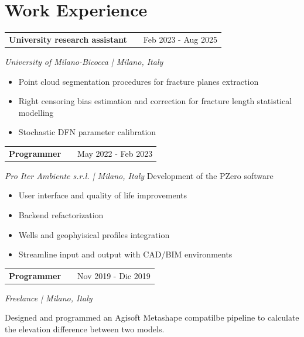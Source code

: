 \documentclass[a4paper,12pt]{article}
\makeatletter
\newenvironment{jobshort}[2]
    {
    \begin{tabularx}{\linewidth}{@{}l X r@{}}
    \textbf{#1} & \hfill &  #2 \\[3.75pt]
    \end{tabularx}
    }
    {
    }
\makeatother
\begin{document}

\section{Work Experience}

\begin{jobshort}{University research assistant}{Feb 2023 - Aug 2025}
    \textit{University of Milano-Bicocca | Milano, Italy}
    \begin{itemize}
        \item Point cloud segmentation procedures for fracture planes extraction
        \item Right censoring bias estimation and correction for fracture length statistical modelling
        \item Stochastic DFN parameter calibration
    \end{itemize}
\end{jobshort}


\begin{jobshort}{Programmer}{May 2022 - Feb 2023}
    \textit{Pro Iter Ambiente s.r.l. | Milano, Italy}
    \newline
    Development of the PZero software
    \begin{itemize}
        \item User interface and quality of life improvements
        \item Backend refactorization
        \item Wells and geophyisical profiles integration 
        \item Streamline input and output with CAD/BIM environments 
    \end{itemize}
\end{jobshort}


\begin{jobshort}{Programmer}{Nov 2019 - Dic 2019}
    \textit{Freelance | Milano, Italy}

    Designed and programmed an Agisoft Metashape compatilbe pipeline to calculate the elevation difference between two models. 
\end{jobshort}


\end{document}
